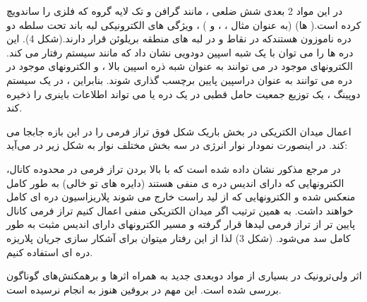 در این مواد 2 بعدی شش ضلعی ، مانند گرافن و تک لایه گروه  که فلزی را ساندویچ کرده است.( ها) (به عنوان مثال  ،  ،  و ) ، ویژگی های الکترونیکی لبه باند تحت سلطه دو دره ناموزون هستندکه در نقاط  و  در لبه های منطقه بریلوئن  قرار دارند.(شکل 4). این دره ها را می توان با یک شبه اسپین دودویی نشان داد که مانند سیستم  رفتار می کند. الکترونهای موجود در  می توانند به عنوان شبه ذره اسپین بالا ، و الکترونهای موجود در دره  می توانند به عنوان دراسپین پایین برچسب گذاری شوند. بنابراین ، در یک سیستم دوپینگ ، یک توزیع جمعیت حامل قطبی در یک دره  یا  می تواند اطلاعات باینری را ذخیره کند.

اعمال میدان الکتریکی در بخش باریک شکل فوق تراز فرمی را در این بازه جابجا می کند. در اینصورت نمودار نوار انرژی در سه بخش مختلف نوار به شکل زیر در می‌آید:

در مرجع مذکور نشان داده شده است که با بالا بردن تراز فرمی در محدوده کانال، الکترونهایی که دارای اندیس دره ی منفی هستند (دایره های تو خالی) به طور کامل منعکس شده و الکترونهایی که از لید راست خارج می شوند پلاریزاسیون دره ای کامل خواهند داشت. به همین ترتیب اگر میدان الکتریکی منفی اعمال کنیم تراز فرمی کانال پایین تر از تراز فرمی لیدها قرار گرفته و مسیر الکترونهای دارای اندیس مثبت به طور کامل سد می‌شود. (شکل 3)  لذا از این رفتار میتوان برای آشکار سازی جریان پلاریزه دره ای استفاده کنیم.

اثر ولی‌ترونیک در بسیاری از مواد دوبعدی جدید به همراه اثرها و برهمکنش‌های گوناگون بررسی شده است. این مهم در بروفین هنوز به انجام نرسیده است.